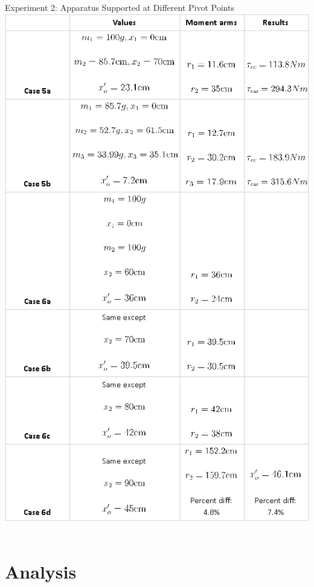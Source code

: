 \documentclass[12pt]{article}
\begin{document}
        \begin{minipage}{\linewidth} %
            {\large Experiment 2: Apparatus Supported at Different Pivot Points} \\
            \includegraphics[scale=0.7 ]{Table2.png} \\ \\
        \end{minipage}
    \section{Analysis}
\end{document}
